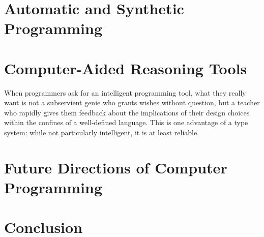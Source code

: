 \documentclass[10pt]{article}
\begin{document}
  \section{Automatic and Synthetic Programming}



  \section{Computer-Aided Reasoning Tools}

When programmers ask for an intelligent programming tool, what they really want is not a subservient genie who grants wishes without question, but a teacher who rapidly gives them feedback about the implications of their design choices within the confines of a well-defined language. This is one advantage of a type system: while not particularly intelligent, it is at least reliable.

  \section{Future Directions of Computer Programming}

  \section{Conclusion}

  
  
\end{document}
